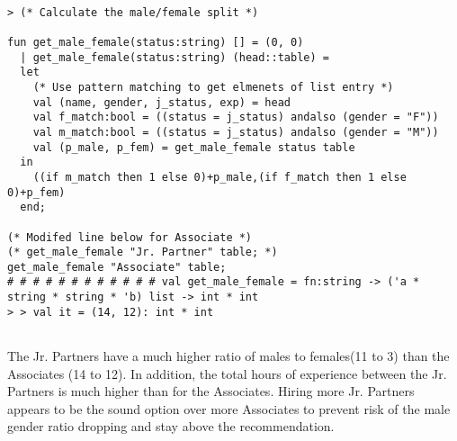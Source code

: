 \documentclass{report}
\begin{document}
\begin{session}
  \begin{scriptsize}
\begin{verbatim}

> (* Calculate the male/female split *)

fun get_male_female(status:string) [] = (0, 0)
  | get_male_female(status:string) (head::table) =
  let
    (* Use pattern matching to get elmenets of list entry *)
    val (name, gender, j_status, exp) = head
    val f_match:bool = ((status = j_status) andalso (gender = "F"))
    val m_match:bool = ((status = j_status) andalso (gender = "M"))
    val (p_male, p_fem) = get_male_female status table
  in
    ((if m_match then 1 else 0)+p_male,(if f_match then 1 else 0)+p_fem)
  end;

(* Modifed line below for Associate *)
(* get_male_female "Jr. Partner" table; *)
get_male_female "Associate" table;
# # # # # # # # # # # # val get_male_female = fn:string -> ('a * string * string * 'b) list -> int * int
> > val it = (14, 12): int * int


\end{verbatim}
  \end{scriptsize}
\end{session}

The Jr. Partners have a much higher ratio of males to females(11 to 3) than the Associates (14 to 12). In addition, the total hours of 
experience between the Jr. Partners is much higher than for the Associates. Hiring more Jr. Partners appears to be the sound option over
more Associates to prevent risk of the male gender ratio dropping and stay above the recommendation. 
\end{document}
